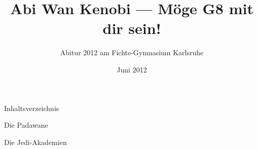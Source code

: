 
\usepackage{pdfpages}

\AddEverypageHook{\ifnum\value{usegfc}=1 \makegbg \makefoot \fi}

\title{Abi Wan Kenobi --- Möge G8 mit dir sein!}
\author{Abitur 2012 am Fichte-Gymnasium Karlsruhe}
\date{Juni 2012}
\maketitle
\newpage


\newpage


\newpage

Inhaltsverzeichnis

\renewcommand{\generictitle}{die padawane}
\cleardoublepage
Die Padawane
\newpage
\gfon



\renewcommand{\generictitle}{die jedi-akademien}
\cleardoublepage
\newpage
Die Jedi-Akademien



%


%


%


